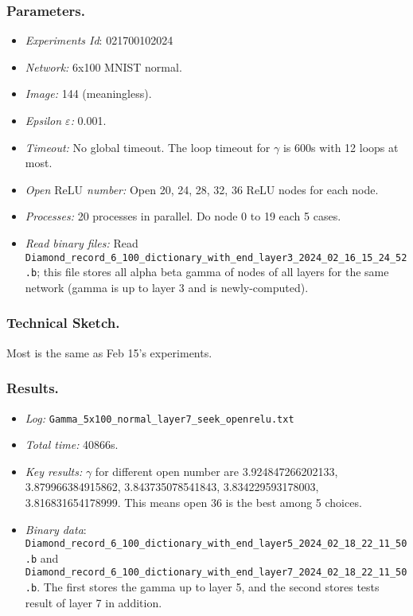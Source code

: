 \documentclass{llncs}
\newcommand{\ReLU}{\mathrm{ReLU}}
\begin{document}
\subsubsection*{Parameters.}

\begin{itemize}
	\item\emph{Experiments Id}: 021700102024
	
	\item\emph{Network:} 6x100 MNIST normal. 
	
	\item\emph{Image:} 144 (meaningless).
	
	\item\emph{Epsilon $\varepsilon$:} 0.001.
	
	\item\emph{Timeout:} No global timeout. The loop timeout for $\gamma$ is 600s with 12 loops at most.
	
	\item\emph{Open $\ReLU$ number:} Open 20, 24, 28, 32, 36 ReLU nodes for each node.
	
	\item\emph{Processes:} 20 processes in parallel. Do node 0 to 19 each 5 cases.
	
	\item\emph{Read binary files:} Read \verb*|Diamond_record_6_100_dictionary_with_end_layer3_2024_02_16_15_24_52.b|; this file stores all alpha beta gamma of nodes of all layers for the same network (gamma is up to layer 3 and is newly-computed). 
\end{itemize}


\subsubsection*{Technical Sketch.}

Most is the same as Feb 15's experiments.

\subsubsection*{Results.}

\begin{itemize}
	\item \emph{Log:} \verb*|Gamma_5x100_normal_layer7_seek_openrelu.txt|
	
	\item \emph{Total time:} 40866s.
	
	\item \emph{Key results:} $\gamma$ for different open number are 3.924847266202133,
	3.879966384915862,
	3.843735078541843,
	3.834229593178003,
	3.816831654178999. This means open 36 is the best among 5 choices.
	
	\item \emph{Binary data}: \verb*|Diamond_record_6_100_dictionary_with_end_layer5_2024_02_18_22_11_50.b| and \verb*|Diamond_record_6_100_dictionary_with_end_layer7_2024_02_18_22_11_50.b|. The first stores the gamma up to layer 5, and the second stores tests result of layer 7 in addition.
\end{itemize}
\end{document}
